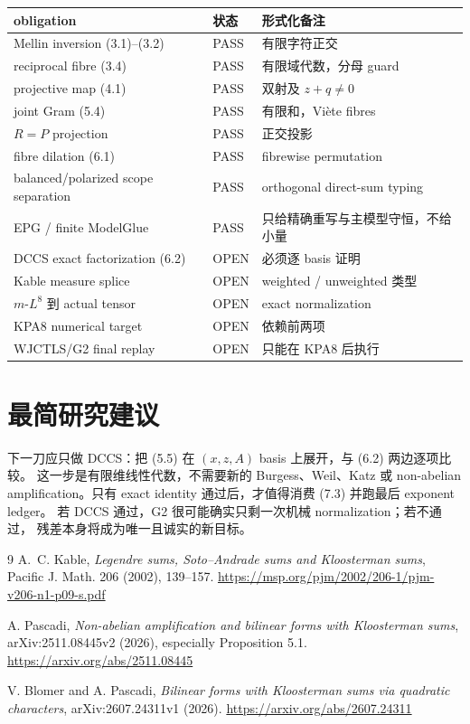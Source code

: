 \documentclass[11pt,a4paper]{ctexart}
\theoremstyle{definition}
\newcommand{\1}{\mathbf 1}
\newcommand{\OPEN}{\textcolor{red!70!black}{\textsf{OPEN}}}
\newcommand{\PASS}{\textcolor{green!45!black}{\textsf{PASS}}}
\begin{document}
\begin{center}
\begin{tabular}{p{}p{}p{}}
\toprule
obligation & 状态 & 形式化备注\\
\midrule
Mellin inversion (3.1)--(3.2) & \PASS & 有限字符正交\\
reciprocal fibre (3.4) & \PASS & 有限域代数，分母 guard\\
projective map (4.1) & \PASS & 双射及 $z+q\ne0$\\
joint Gram (5.4) & \PASS & 有限和，Vi\`ete fibres\\
$R=P$ projection & \PASS & 正交投影\\
fibre dilation (6.1) & \PASS & fibrewise permutation\\
balanced/polarized scope separation & \PASS & orthogonal direct-sum typing\\
EPG / finite ModelGlue & \PASS & 只给精确重写与主模型守恒，不给小量\\
DCCS exact factorization (6.2) & \OPEN & 必须逐 basis 证明\\
Kable measure splice & \OPEN & weighted / unweighted 类型\\
$m$-$L^8$ 到 actual tensor & \OPEN & exact normalization\\
KPA8 numerical target & \OPEN & 依赖前两项\\
WJCTLS/G2 final replay & \OPEN & 只能在 KPA8 后执行\\
\bottomrule
\end{tabular}
\end{center}

\section{最简研究建议}

下一刀应只做 DCCS：把 (5.5) 在 $(x,z,A)$ basis 上展开，与 (6.2) 两边逐项比较。
这一步是有限维线性代数，不需要新的 Burgess、Weil、Katz 或 non-abelian
amplification。只有 exact identity 通过后，才值得消费 (7.3) 并跑最后 exponent ledger。
若 DCCS 通过，G2 很可能确实只剩一次机械 normalization；若不通过，
残差本身将成为唯一且诚实的新目标。

\begin{thebibliography}{9}
A.~C. Kable,
\emph{Legendre sums, Soto--Andrade sums and Kloosterman sums},
Pacific J. Math. 206 (2002), 139--157.
\url{https://msp.org/pjm/2002/206-1/pjm-v206-n1-p09-s.pdf}

A. Pascadi,
\emph{Non-abelian amplification and bilinear forms with Kloosterman sums},
arXiv:2511.08445v2 (2026), especially Proposition 5.1.
\url{https://arxiv.org/abs/2511.08445}

V. Blomer and A. Pascadi,
\emph{Bilinear forms with Kloosterman sums via quadratic characters},
arXiv:2607.24311v1 (2026).
\url{https://arxiv.org/abs/2607.24311}
\end{thebibliography}
\end{document}
